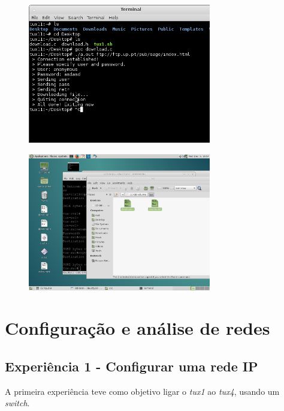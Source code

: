 \documentclass{article}
\begin{document}
\begin{figure}[h]
\centering
\includegraphics[width=8cm]{images/screen_dl.png}
\end{figure}

\begin{figure}[H]
\centering
\includegraphics[width=8cm]{images/screen_dl_2.png}
\end{figure}

\begin{figure}
\end{figure}
\section{Configuração e análise de redes}
\subsection{Experiência 1 - Configurar uma rede IP}

A primeira experiência teve como objetivo ligar o \textit{tux1} ao \textit{tux4}, usando um \textit{switch}. 
\end{document}
